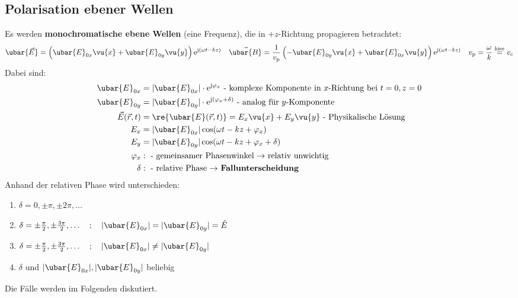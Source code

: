  \subsection{Polarisation ebener Wellen}\label{poleb}
		 Es werden \textbf{monochromatische ebene Wellen} (eine Frequenz), die in \(+z\)-Richtung propagieren betrachtet:
		        \begin{align}\label{polallglsg}
			        \ubar{\vec{E}} & = \left( \ubar{E}_{0x}\vu{x} + \ubar{E}_{0y}\vu{y}\right) \mathrm{e}^{\mathrm{j}( \omega t -  k z)}                         &
			        \vec{\ubar{B}} & = \frac{1}{ v_{\mathrm{p}}}\left(-\ubar{E}_{0y}\vu{x} +\ubar{E}_{0x}\vu{y}\right)  \mathrm{e}^{\mathrm{j}(\omega t -  k z)} & v_{\mathrm{p}}= \frac{\omega}{k} \stackrel{\text{hier}}{=}  v_{\mathrm{c}}
		        \end{align}
		  Dabei sind:
		        \begin{equation}\begin{split}
				        \ubar{E}_{0x} &= \vert \ubar{E}_{0x} \vert \cdot  \mathrm{e}^{\mathrm{j}\varphi_x} \text{ - komplexe Komponente in \(x\)-Richtung bei \(t=0, z=0\)}\\
				        \ubar{E}_{0y} &= \vert \ubar{E}_{0y} \vert \cdot  \mathrm{e}^{\mathrm{j}(\varphi_x+ \delta)} \text{ - analog für \(y\)-Komponente}\\
				        \vec{E} (\vec{r} , t) &= \re{\ubar{E}(\vec{r} , t)} = E_x \vu{x} + E_y \vu{y} \text{ - Physikalische Lösung}\\
				        E_x &= \vert \ubar{E}_{0x} \vert \cos(\omega t -  k z + \varphi_x )\\
				        E_y &= \vert \ubar{E}_{0y} \vert \cos(\omega t -  k z + \varphi_x +\delta)\\
				        \varphi_x &: \text{ - gemeinsamer Phasenwinkel \(\to\) relativ unwichtig}\\
				        \delta &: \text{ - relative Phase \(\to\) \textbf{Fallunterscheidung}}
			        \end{split}\end{equation}
		 Anhand der relativen Phase wird unterschieden:
		        \begin{enumerate}
			        \item \(\delta = 0, \pm \pi , \pm 2\pi, \ldots\)
			        \item \(  \delta = \pm \frac{\pi}{2}, \pm \frac{3\pi}{2},\ldots \quad ;\quad\vert \ubar{E}_{0x} \vert = \vert \ubar{E}_{0y} \vert = \hat{E} \)
			        \item \( \delta = \pm \frac{\pi}{2}, \pm \frac{3\pi}{2},\ldots \quad ;\quad\vert \ubar{E}_{0x} \vert \neq \vert \ubar{E}_{0y} \vert \)
			        \item \(\delta\) und \(\vert \ubar{E}_{0x} \vert, \vert \ubar{E}_{0y} \vert\) beliebig
		        \end{enumerate}
		        Die Fälle werden im Folgenden diskutiert.
